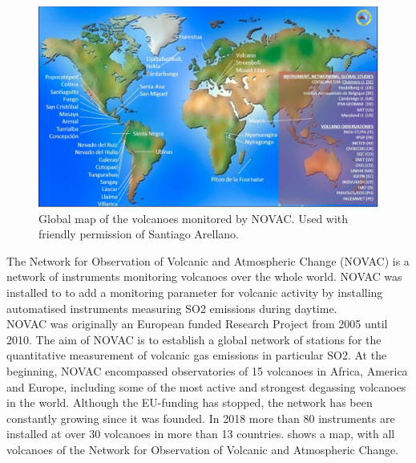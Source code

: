 


		\begin{figure}[h]
			\centering
			\includegraphics[width=0.8\linewidth]{Bilder/NOVAC2015}
			\caption{Global map of the volcanoes monitored by NOVAC. Used with friendly permission of Santiago Arellano.}
			\label{fig:novac2015}
		\end{figure}
		The Network for Observation of Volcanic and Atmospheric Change (NOVAC) is a network of instruments monitoring volcanoes over the whole world. 
		NOVAC was installed to to add a monitoring parameter for volcanic activity by installing automatised instruments measuring SO2 emissions during daytime.\\
		NOVAC was originally an European funded Research Project from 2005 until 2010. The aim of NOVAC is to  establish  a  global  
		network  of  stations  for  the  quantitative  measurement  of  volcanic gas  emissions in particular SO2. At the beginning, NOVAC encompassed observatories of 15 volcanoes in Africa, America and Europe, including some of the most active and strongest degassing volcanoes in the world. Although the EU-funding has stopped, the network has been constantly growing since it was founded. In 2018 more than 80 instruments are installed at over 30 volcanoes in more than 13 countries.
		 shows a map, with all volcanoes of the Network for Observation of Volcanic and Atmospheric Change.\\
		
